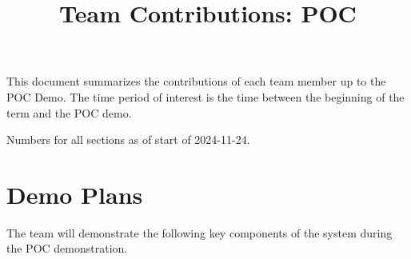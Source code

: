 \documentclass{article}
\title{Team Contributions: POC\\\progname}
\author{\authname}
\date{}
\begin{document}
\maketitle

This document summarizes the contributions of each team member up to the POC
Demo.  The time period of interest is the time between the beginning of the term
and the POC demo.

Numbers for all sections as of start of 2024-11-24.

\newpage
\section{Demo Plans}

\noindent The team will demonstrate the following key components of the system during the POC demonstration. 
\end{document}
